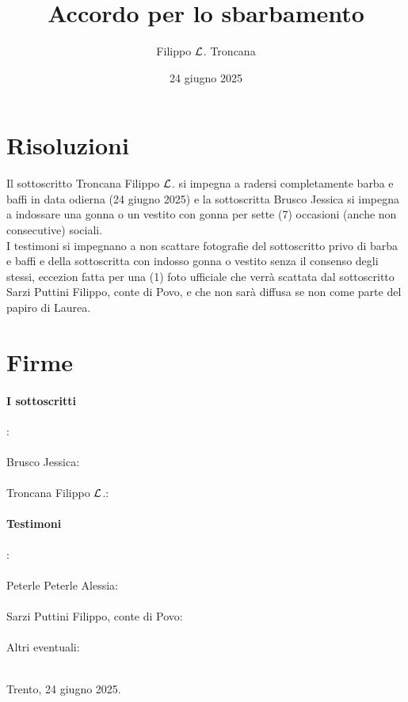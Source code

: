 \documentclass{article}
\title{Accordo per lo sbarbamento}
\author{Filippo $\mathcal{L}$. Troncana}
\date{24 giugno 2025}
\begin{document}
\maketitle

\section{Risoluzioni}

Il sottoscritto Troncana Filippo $\mathcal{L}$. si impegna a radersi completamente barba e baffi in data odierna (24 giugno 2025) e la sottoscritta Brusco Jessica si impegna a indossare una gonna o un vestito con gonna per sette (7) occasioni (anche non consecutive) sociali.\\
I testimoni si impegnano a non scattare fotografie del sottoscritto privo di barba e baffi e della sottoscritta con indosso gonna o vestito senza il consenso degli stessi, eccezion fatta per una (1) foto ufficiale che verrà scattata dal sottoscritto Sarzi Puttini Filippo, conte di Povo, e che non sarà diffusa se non come parte del papiro di Laurea.

\section{Firme}

\paragraph{I sottoscritti}:
\\
\bigskip
\\
Brusco Jessica: \hrulefill
\\
\bigskip
\\
Troncana Filippo $\mathcal{L}$.: \hrulefill
\\
\paragraph{Testimoni}:
\\
\bigskip
\\
Peterle Peterle Alessia: \hrulefill
\\
\bigskip
\\
Sarzi Puttini Filippo, conte di Povo: \hrulefill
\\
\bigskip
\\
Altri eventuali: \hrulefill 
\\
\bigskip
\\
\begin{flushright}
    Trento, 24 giugno 2025.
\end{flushright}
\end{document}
